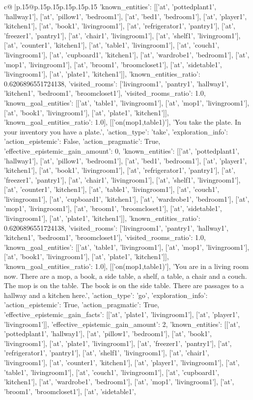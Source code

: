 \documentclass{article}
\begin{document}
{\begin{supertabular}{c@{$\;$}|p{.15\linewidth}@{}p{.15\linewidth}p{.15\linewidth}p{.15\linewidth}p{.15\linewidth}p{.15\linewidth}}
{{{'known_entities': [['at', 'pottedplant1', 'hallway1'], ['at', 'pillow1', 'bedroom1'], ['at', 'bed1', 'bedroom1'], ['at', 'player1', 'kitchen1'], ['at', 'book1', 'livingroom1'], ['at', 'refrigerator1', 'pantry1'], ['at', 'freezer1', 'pantry1'], ['at', 'chair1', 'livingroom1'], ['at', 'shelf1', 'livingroom1'], ['at', 'counter1', 'kitchen1'], ['at', 'table1', 'livingroom1'], ['at', 'couch1', 'livingroom1'], ['at', 'cupboard1', 'kitchen1'], ['at', 'wardrobe1', 'bedroom1'], ['at', 'mop1', 'livingroom1'], ['at', 'broom1', 'broomcloset1'], ['at', 'sidetable1', 'livingroom1'], ['at', 'plate1', 'kitchen1']], 'known_entities_ratio': 0.6206896551724138, 'visited_rooms': ['livingroom1', 'pantry1', 'hallway1', 'kitchen1', 'bedroom1', 'broomcloset1'], 'visited_rooms_ratio': 1.0, 'known_goal_entities': [['at', 'table1', 'livingroom1'], ['at', 'mop1', 'livingroom1'], ['at', 'book1', 'livingroom1'], ['at', 'plate1', 'kitchen1']], 'known_goal_entities_ratio': 1.0}}], [['on(mop1,table1)'], 'You take the plate. In your inventory you have a plate.', {'action_type': 'take', 'exploration_info': {'action_epistemic': False, 'action_pragmatic': True, 'effective_epistemic_gain_amount': 0, 'known_entities': [['at', 'pottedplant1', 'hallway1'], ['at', 'pillow1', 'bedroom1'], ['at', 'bed1', 'bedroom1'], ['at', 'player1', 'kitchen1'], ['at', 'book1', 'livingroom1'], ['at', 'refrigerator1', 'pantry1'], ['at', 'freezer1', 'pantry1'], ['at', 'chair1', 'livingroom1'], ['at', 'shelf1', 'livingroom1'], ['at', 'counter1', 'kitchen1'], ['at', 'table1', 'livingroom1'], ['at', 'couch1', 'livingroom1'], ['at', 'cupboard1', 'kitchen1'], ['at', 'wardrobe1', 'bedroom1'], ['at', 'mop1', 'livingroom1'], ['at', 'broom1', 'broomcloset1'], ['at', 'sidetable1', 'livingroom1'], ['at', 'plate1', 'kitchen1']], 'known_entities_ratio': 0.6206896551724138, 'visited_rooms': ['livingroom1', 'pantry1', 'hallway1', 'kitchen1', 'bedroom1', 'broomcloset1'], 'visited_rooms_ratio': 1.0, 'known_goal_entities': [['at', 'table1', 'livingroom1'], ['at', 'mop1', 'livingroom1'], ['at', 'book1', 'livingroom1'], ['at', 'plate1', 'kitchen1']], 'known_goal_entities_ratio': 1.0}}], [['on(mop1,table1)'], 'You are in a living room now. There are a mop, a book, a side table, a shelf, a table, a chair and a couch. The mop is on the table. The book is on the side table. There are passages to a hallway and a kitchen here.', {'action_type': 'go', 'exploration_info': {'action_epistemic': True, 'action_pragmatic': True, 'effective_epistemic_gain_facts': [['at', 'plate1', 'livingroom1'], ['at', 'player1', 'livingroom1']], 'effective_epistemic_gain_amount': 2, 'known_entities': [['at', 'pottedplant1', 'hallway1'], ['at', 'pillow1', 'bedroom1'], ['at', 'book1', 'livingroom1'], ['at', 'plate1', 'livingroom1'], ['at', 'freezer1', 'pantry1'], ['at', 'refrigerator1', 'pantry1'], ['at', 'shelf1', 'livingroom1'], ['at', 'chair1', 'livingroom1'], ['at', 'counter1', 'kitchen1'], ['at', 'player1', 'livingroom1'], ['at', 'table1', 'livingroom1'], ['at', 'couch1', 'livingroom1'], ['at', 'cupboard1', 'kitchen1'], ['at', 'wardrobe1', 'bedroom1'], ['at', 'mop1', 'livingroom1'], ['at', 'broom1', 'broomcloset1'], ['at', 'sidetable1', }}}
\end{supertabular}}
\end{document}
